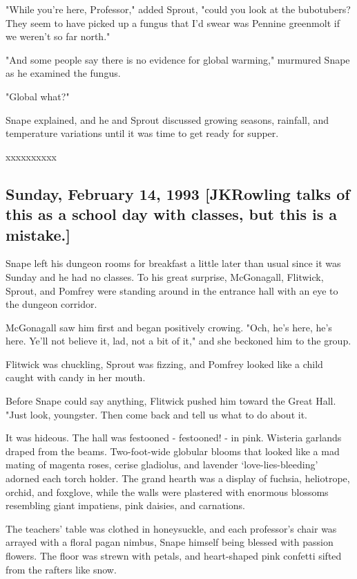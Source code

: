 \documentclass[a4paper,11pt]{article}
\begin{document}
"While you're here, Professor," added Sprout, "could you look at the bubotubers? They seem to have picked up a fungus that I'd swear was Pennine greenmolt if we weren't so far north."

"And some people say there is no evidence for global warming," murmured Snape as he examined the fungus.

"Global what?"

Snape explained, and he and Sprout discussed growing seasons, rainfall, and temperature variations until it was time to get ready for supper.

xxxxxxxxxx

\subsection{Sunday, February 14, 1993 [JKRowling talks of this as a school day with classes, but this is a mistake.]}

Snape left his dungeon rooms for breakfast a little later than usual since it was Sunday and he had no classes. To his great surprise, McGonagall, Flitwick, Sprout, and Pomfrey were standing around in the entrance hall with an eye to the dungeon corridor.

McGonagall saw him first and began positively crowing. "Och, he's here, he's here. Ye'll not believe it, lad, not a bit of it," and she beckoned him to the group.

Flitwick was chuckling, Sprout was fizzing, and Pomfrey looked like a child caught with candy in her mouth.

Before Snape could say anything, Flitwick pushed him toward the Great Hall. "Just look, youngster. Then come back and tell us what to do about it.

It was hideous. The hall was festooned - festooned! - in pink. Wisteria garlands draped from the beams. Two-foot-wide globular blooms that looked like a mad mating of magenta roses, cerise gladiolus, and lavender `love-lies-bleeding' adorned each torch holder. The grand hearth was a display of fuchsia, heliotrope, orchid, and foxglove, while the walls were plastered with enormous blossoms resembling giant impatiens, pink daisies, and carnations.

The teachers' table was clothed in honeysuckle, and each professor's chair was arrayed with a floral pagan nimbus, Snape himself being blessed with passion flowers. The floor was strewn with petals, and heart-shaped pink confetti sifted from the rafters like snow.
\end{document}
